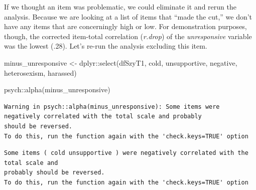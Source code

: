 \documentclass[
  english,
]{book}
\newenvironment{Shaded}{\begin{snugshade}}{\end{snugshade}}
\newcommand{\FunctionTok}[1]{\textcolor[rgb]{0.00,0.00,0.00}{#1}}
\newcommand{\NormalTok}[1]{#1}
\newcommand{\OtherTok}[1]{\textcolor[rgb]{0.56,0.35,0.01}{#1}}
\newcommand{\SpecialCharTok}[1]{\textcolor[rgb]{0.00,0.00,0.00}{#1}}
\begin{document}
If we thought an item was problematic, we could eliminate it and rerun the analysis. Because we are looking at a list of items that ``made the cut,'' we don't have any items that are concerningly high or low. For demonstration purposes, though, the corrected item-total correlation (\emph{r.drop}) of the \emph{unresponsive} variable was the lowest (.28). Let's re-run the analysis excluding this item.

\begin{Shaded}
\begin{Highlighting}[]
\NormalTok{minus\_unresponsive }\OtherTok{\textless{}{-}}\NormalTok{ dplyr}\SpecialCharTok{::}\FunctionTok{select}\NormalTok{(dfSzyT1, cold,  unsupportive, negative, heterosexism, harassed)}
\end{Highlighting}
\end{Shaded}

\begin{Shaded}
\begin{Highlighting}[]
\NormalTok{psych}\SpecialCharTok{::}\FunctionTok{alpha}\NormalTok{(minus\_unresponsive) }
\end{Highlighting}
\end{Shaded}

\begin{verbatim}
Warning in psych::alpha(minus_unresponsive): Some items were negatively correlated with the total scale and probably 
should be reversed.  
To do this, run the function again with the 'check.keys=TRUE' option
\end{verbatim}

\begin{verbatim}
Some items ( cold unsupportive ) were negatively correlated with the total scale and 
probably should be reversed.  
To do this, run the function again with the 'check.keys=TRUE' option
\end{verbatim}
\end{document}
